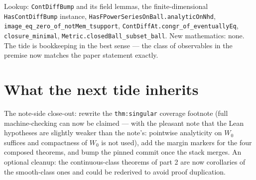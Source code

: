 \documentclass[11pt]{article}
\newcommand{\code}[1]{\texttt{#1}}
\begin{document}
\begin{sloppypar}
Lookup: \code{ContDiffBump} and its field lemmas, the
finite-dimensional \code{HasContDiffBump} instance,
\code{HasFPowerSeriesOnBall.analyticOnNhd},
\code{image\_eq\_zero\_of\_notMem\_tsupport},
\code{ContDiffAt.congr\_of\_eventuallyEq}, \code{closure\_minimal},
\code{Metric.closedBall\_subset\_ball}. New mathematics: none. The
tide is bookkeeping in the best sense --- the class of observables in
the premise now matches the paper statement exactly.
\end{sloppypar}

\section{What the next tide inherits}

The note-side close-out: rewrite the \code{thm:singular} coverage
footnote (full machine-checking can now be claimed --- with the
pleasant note that the Lean hypotheses are slightly weaker than the
note's: pointwise analyticity on $W_0$ suffices and compactness of
$W_0$ is not used), add the margin markers for the four composed
theorems, and bump the pinned commit once the stack merges. An
optional cleanup: the continuous-class theorems of part 2 are now
corollaries of the smooth-class ones and could be rederived to avoid
proof duplication.
\end{document}
